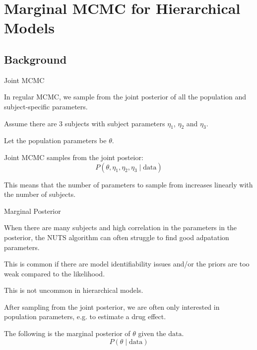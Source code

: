 
\section{Marginal MCMC for Hierarchical Models}

\subsection{Background}
\begin{frame}{Joint MCMC}
	\begin{vfilleditems}
		\item In regular MCMC, we sample from the joint posterior of all the population and subject-specific parameters.
		\item Assume there are 3 subjects with subject parameters $\eta_1$, $\eta_2$ and $\eta_3$.
		\item Let the population parameters be $\theta$.
		\item Joint MCMC samples from the joint posteior:
		$$
			P(\theta, \eta_1, \eta_2, \eta_3 \mid \text{data})
		$$
		\item This means that the number of parameters to sample from increases linearly with the number of subjects.
	\end{vfilleditems}
\end{frame}

\begin{frame}{Marginal Posterior}
	\begin{vfilleditems}
		\item When there are many subjects and high correlation in the parameters in the posterior, the NUTS algorithm can often struggle to find good adpatation parameters.
		\item This is common if there are model identifiability issues and/or the priors are too weak compared to the likelihood.
		\item This is not uncommon in hierarchical models.
		\item After sampling from the joint posterior, we are often only interested in population parameters, e.g. to estimate a drug effect.
		\item The following is the marginal posterior of $\theta$ given the $\text{data}$.
		$$
			P(\theta \mid \text{data})
		$$
	\end{vfilleditems}
\end{frame}

